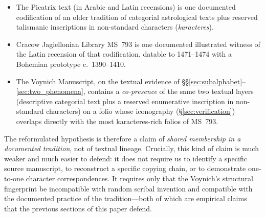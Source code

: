 \begin{itemize}[itemsep=0pt,topsep=2pt]
\item The Picatrix text (in Arabic and Latin recensions) is one
documented codification of an older tradition of categorial astrological
texts plus reserved talismanic inscriptions in non-standard characters
(\textit{karacteres}).
\item Cracow Jagiellonian Library MS~793 is one documented illustrated
witness of the Latin recension of that codification, datable to
1471--1474 with a Bohemian prototype c.~1390--1410.
\item The Voynich Manuscript, on the textual evidence of
\S\S\ref{sec:subalphabet}--\ref{sec:two_phenomena}, contains a
\emph{co-presence} of the same two textual layers (descriptive
categorial text plus a reserved enumerative inscription in
non-standard characters) on a folio whose iconography
(\S\ref{sec:verification}) overlaps directly with the most karacteres-rich
folios of MS~793.
\end{itemize}

The reformulated hypothesis is therefore a claim of \emph{shared
membership in a documented tradition}, not of textual lineage.
Crucially, this kind of claim is much weaker and much easier to
defend: it does not require us to identify a specific source manuscript,
to reconstruct a specific copying chain, or to demonstrate one-to-one
character correspondences. It requires only that the Voynich's
structural fingerprint be incompatible with random scribal invention
and compatible with the documented practice of the tradition---both
of which are empirical claims that the previous sections of this paper
defend.

